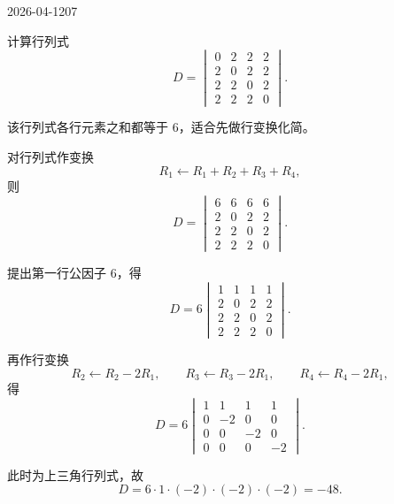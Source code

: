 \begin{mistake}{2026-04-12}{07}

\begin{problemcontent}
计算行列式
\[
D=\begin{vmatrix}
0&2&2&2\\
2&0&2&2\\
2&2&0&2\\
2&2&2&0
\end{vmatrix}.
\]

\end{problemcontent}

\begin{solutioncontent}
该行列式各行元素之和都等于 \(6\)，适合先做行变换化简。

对行列式作变换
\[
R_1\leftarrow R_1+R_2+R_3+R_4,
\]
则
\[
D=\begin{vmatrix}
6&6&6&6\\
2&0&2&2\\
2&2&0&2\\
2&2&2&0
\end{vmatrix}.
\]

提出第一行公因子 \(6\)，得
\[
D=6\begin{vmatrix}
1&1&1&1\\
2&0&2&2\\
2&2&0&2\\
2&2&2&0
\end{vmatrix}.
\]

再作行变换
\[
R_2\leftarrow R_2-2R_1,\qquad
R_3\leftarrow R_3-2R_1,\qquad
R_4\leftarrow R_4-2R_1,
\]
得
\[
D=6\begin{vmatrix}
1&1&1&1\\
0&-2&0&0\\
0&0&-2&0\\
0&0&0&-2
\end{vmatrix}.
\]

此时为上三角行列式，故
\[
D=6\cdot 1\cdot(-2)\cdot(-2)\cdot(-2)=-48.
\]

\end{solutioncontent}


\end{mistake}
